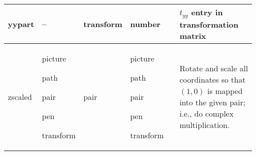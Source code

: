 \begin{longtable}{|>{\raggedright{}\ttfamily}p{.793in}*{3}{|>{\raggedright}p{.715in}}|>{\raggedleft}p{1.5em}|>{\raggedright\arraybackslash}X|}
yypart&  --&  transform&  number&  \pageref{Dtrprt}&  $t_{yy}$ entry in transformation matrix\\\hline
zscaled &  picture\par path\par pair\par pen\par transform&  pair&  picture\par path\par pair\par pen\par transform&  \pageref{Dtranop}&  Rotate and scale all coordinates so that $(1,0)$ is mapped into the given pair; i.e., do complex multiplication.\\\hline
\end{longtable}
